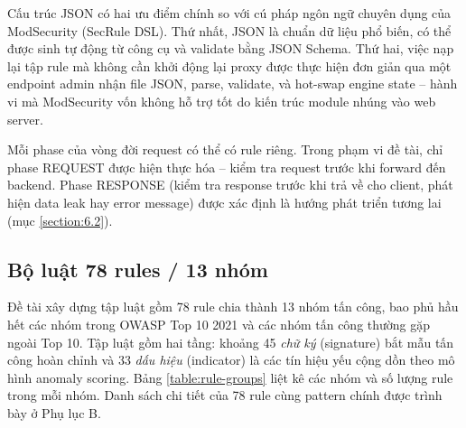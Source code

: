 \documentclass[../DoAn.tex]{subfiles}
\begin{document}
Cấu trúc JSON có hai ưu điểm chính so với cú pháp ngôn ngữ chuyên dụng của
ModSecurity (SecRule DSL). Thứ nhất, JSON là chuẩn dữ liệu phổ biến, có thể
được sinh tự động từ công cụ và validate bằng JSON Schema. Thứ hai, việc
nạp lại tập rule mà không cần khởi động lại proxy được thực hiện đơn giản
qua một endpoint admin nhận file JSON, parse, validate, và hot-swap engine
state -- hành vi mà ModSecurity vốn không hỗ trợ tốt do kiến trúc module
nhúng vào web server.

Mỗi phase của vòng đời request có thể có rule riêng. Trong phạm vi đề tài,
chỉ phase REQUEST được hiện thực hóa -- kiểm tra request trước khi forward
đến backend. Phase RESPONSE (kiểm tra response trước khi trả về cho client,
phát hiện data leak hay error message) được xác định là hướng phát triển
tương lai (mục \ref{section:6.2}).

\subsection{Bộ luật 78 rules / 13 nhóm}
\label{subsection:3.2.3}

Đề tài xây dựng tập luật gồm 78 rule chia thành 13 nhóm tấn công, bao phủ
hầu hết các nhóm trong OWASP Top 10 2021 và các nhóm tấn công thường gặp
ngoài Top 10. Tập luật gồm hai tầng: khoảng 45 \textit{chữ ký} (signature)
bắt mẫu tấn công hoàn chỉnh và 33 \textit{dấu hiệu} (indicator) là các tín
hiệu yếu cộng dồn theo mô hình anomaly scoring. Bảng \ref{table:rule-groups}
liệt kê các nhóm và số lượng rule trong mỗi nhóm. Danh sách chi tiết của 78
rule cùng pattern chính được trình bày ở Phụ lục B.
\end{document}
